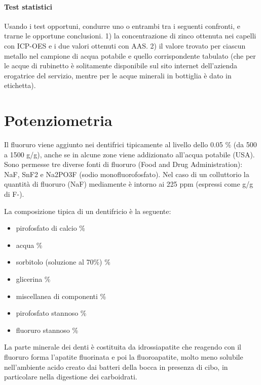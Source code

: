 \paragraph{Test statistici}
Usando i test opportuni, condurre uno o entrambi tra i seguenti confronti, e trarne le opportune conclusioni. 1) la concentrazione di zinco ottenuta nei capelli con ICP-OES e i due valori ottenuti con AAS. 2) il valore trovato per ciascun metallo nel campione di acqua potabile e quello corrispondente tabulato (che per le acque di rubinetto è solitamente disponibile sul sito internet dell'azienda erogatrice del servizio, mentre per le acque minerali in bottiglia è dato in etichetta).

\section{Potenziometria}

Il fluoruro viene aggiunto nei dentifrici tipicamente al livello dello 0.05 \% (da 500 a 1500 \mu g/g), anche se in alcune zone viene addizionato all'acqua potabile (USA). Sono permesse tre diverse fonti di fluoruro (Food and Drug Administration): NaF, SnF2 e Na2PO3F (sodio monofluorofosfato). Nel caso di un colluttorio la quantità di fluoruro (NaF) mediamente è intorno ai 225 ppm (espressi come \mu g/g di F-).

La composizione tipica di un dentifricio è la seguente:
\begin{itemize}
\item pirofosfato di calcio	\%
\item acqua	\%
\item sorbitolo (soluzione al 70\%) \%
\item glicerina	\%
\item miscellanea di componenti	\%
\item pirofosfato stannoso	\%
\item fluoruro stannoso	\%
\end{itemize}

La parte minerale dei denti è costituita da idrossiapatite che reagendo con il fluoruro forma l'apatite fluorinata e poi la fluoroapatite, molto meno solubile nell'ambiente acido creato dai batteri della bocca in presenza di cibo, in particolare nella digestione dei carboidrati.
\begin{center}
\par
{}
\end{center}

